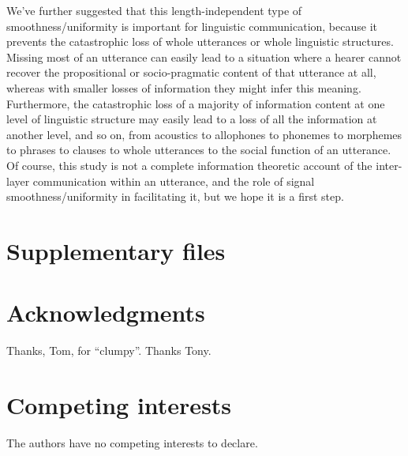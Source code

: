 \documentclass[12pt]{article}
\begin{document}
We've further suggested that this length-independent type of smoothness/uniformity is important for linguistic communication, because it prevents the catastrophic loss of whole utterances or whole linguistic structures. Missing most of an utterance can easily lead to a situation where a hearer cannot recover the propositional or socio-pragmatic content of that utterance at all, whereas with smaller losses of information they might infer this meaning. Furthermore, the catastrophic loss of a majority of information content at one level of linguistic structure may easily lead to a loss of all the information at another level, and so on, from acoustics to allophones to phonemes to morphemes to phrases to clauses to whole utterances to the social function of an utterance. Of course, this study is not a complete information theoretic account of the inter-layer communication within an utterance, and the role of signal smoothness/uniformity in facilitating it, but we hope it is a first step.


\section*{Supplementary files}

\section*{Acknowledgments}

Thanks, Tom, for ``clumpy''. Thanks Tony.

\section*{Competing interests}

The authors have no competing interests to declare.




\end{document}
